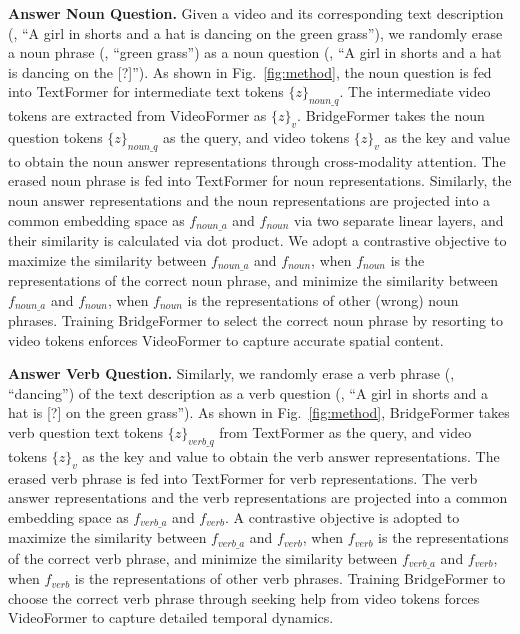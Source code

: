\documentclass[10pt,twocolumn,letterpaper]{article}
\begin{document}
{\flushleft \bf Answer Noun Question.} Given a video and its corresponding text description (\eg, ``A girl in shorts and a hat is dancing on the green grass''), we randomly erase a noun phrase (\eg, ``green grass'') as a noun question (\eg, ``A girl in shorts and a hat is dancing on the [?]''). As shown in Fig.~\ref{fig:method}, the noun question is fed into TextFormer for intermediate text tokens $\{z\}_{noun\_q}$. The intermediate video tokens are extracted from VideoFormer as $\{z\}_v$.  BridgeFormer takes the noun question tokens $\{z\}_{noun\_q}$ as the query, and video tokens $\{z\}_v$ as the key and value to obtain the noun answer representations through cross-modality attention. The erased noun phrase is fed into TextFormer for noun representations.  Similarly, the noun answer representations and the noun representations are projected into a common embedding space as $f_{noun\_a}$ and $f_{noun}$ via two separate linear layers, and their similarity is calculated via dot product. We adopt a contrastive objective to maximize the similarity between $f_{noun\_a}$ and $f_{noun}$, when $f_{noun}$ is the representations of the correct noun phrase, and minimize the similarity between  $f_{noun\_a}$ and $f_{noun}$, when $f_{noun}$ is the representations of other (wrong) noun phrases.  Training BridgeFormer to select the correct noun phrase by resorting to video tokens enforces VideoFormer to capture accurate spatial content.

{\flushleft \bf Answer Verb Question.} Similarly,  we randomly erase a verb phrase (\eg, ``dancing'') of the text description as a verb question (\eg, ``A girl in shorts and a hat is [?] on the green grass''). As shown in Fig.~\ref{fig:method}, BridgeFormer takes verb question text tokens $\{z\}_{verb\_q}$ from TextFormer as the query, and video tokens $\{z\}_v$ as the key and value to obtain the verb answer representations. The erased verb phrase is fed into TextFormer for verb representations. The verb answer representations and the verb representations are projected into a common embedding space as $f_{verb\_a}$ and $f_{verb}$. A contrastive objective is adopted to maximize the similarity between $f_{verb\_a}$ and $f_{verb}$, when $f_{verb}$ is the representations of the correct verb phrase, and minimize the similarity between $f_{verb\_a}$ and $f_{verb}$, when $f_{verb}$ is the representations of other verb phrases. Training BridgeFormer to choose the correct verb phrase through seeking help from video tokens forces VideoFormer to capture detailed temporal dynamics. 
\end{document}
